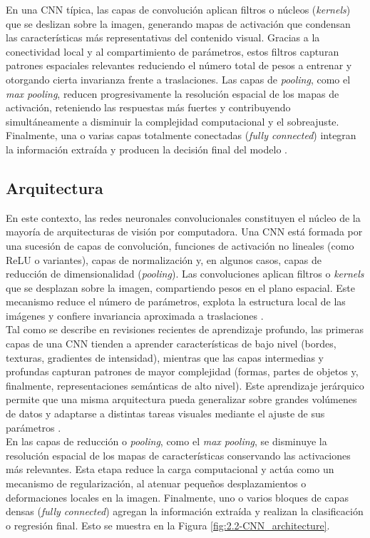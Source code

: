 En una CNN típica, las capas de convolución aplican filtros o núcleos (\textit{kernels}) que se deslizan sobre la imagen, generando mapas de activación que condensan las características más representativas del contenido visual. Gracias a la conectividad local y al compartimiento de parámetros, estos filtros capturan patrones espaciales relevantes reduciendo el número total de pesos a entrenar y otorgando cierta invarianza frente a traslaciones. Las capas de \textit{pooling}, como el \textit{max pooling}, reducen progresivamente la resolución espacial de los mapas de activación, reteniendo las respuestas más fuertes y contribuyendo simultáneamente a disminuir la complejidad computacional y el sobreajuste. Finalmente, una o varias capas totalmente conectadas (\textit{fully connected}) integran la información extraída y producen la decisión final del modelo \cite{ajit2020review,lubinus2023redes}.

\subsection{Arquitectura}

En este contexto, las redes neuronales convolucionales constituyen el núcleo de la mayoría de arquitecturas de visión por computadora. Una CNN está formada por una sucesión de capas de convolución, funciones de activación no lineales (como ReLU o variantes), capas de normalización y, en algunos casos, capas de reducción de dimensionalidad (\textit{pooling}). Las convoluciones aplican filtros o \textit{kernels} que se desplazan sobre la imagen, compartiendo pesos en el plano espacial. Este mecanismo reduce el número de parámetros, explota la estructura local de las imágenes y confiere invariancia aproximada a traslaciones \cite{lubinus2023redes}. \\

Tal como se describe en revisiones recientes de aprendizaje profundo, las primeras capas de una CNN tienden a aprender características de bajo nivel (bordes, texturas, gradientes de intensidad), mientras que las capas intermedias y profundas capturan patrones de mayor complejidad (formas, partes de objetos y, finalmente, representaciones semánticas de alto nivel). Este aprendizaje jerárquico permite que una misma arquitectura pueda generalizar sobre grandes volúmenes de datos y adaptarse a distintas tareas visuales mediante el ajuste de sus parámetros \cite{gupta2022deep,lubinus2023redes}. \\

En las capas de reducción o \textit{pooling}, como el \textit{max pooling}, se disminuye la resolución espacial de los mapas de características conservando las activaciones más relevantes. Esta etapa reduce la carga computacional y actúa como un mecanismo de regularización, al atenuar pequeños desplazamientos o deformaciones locales en la imagen. Finalmente, uno o varios bloques de capas densas (\textit{fully connected}) agregan la información extraída y realizan la clasificación o regresión final. Esto se muestra en la Figura \ref{fig:2.2-CNN_architecture}.

